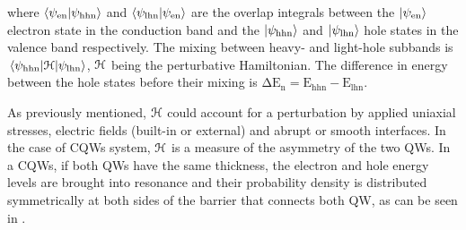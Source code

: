 where $\braket{\psi_{\mathrm{en}}}{\psi_{\mathrm{hhn}}}$  and $\braket{\psi_{\mathrm{lhn}}}{\psi_{\mathrm{en}}}$ are the overlap integrals between the  $\ket{\psi_{\mathrm{en}}}$  electron state in the conduction band and the $\ket{\psi_{\mathrm{hhn}}}$  and  $\ket{\psi_{\mathrm{lhn}}}$   hole states in the valence band respectively. The  mixing between heavy- and light-hole subbands is $\mel{\psi_{\mathrm{hhn}}}{\cal{H}}{\psi_{\mathrm{lhn}}}$, $\cal{H}$  being the  perturbative Hamiltonian. The difference in energy between the hole states before their mixing is $\mathrm{\Delta E_{n} = E_{hhn} - E_{lhn}}$.

As previously mentioned,  $\cal{H}$ could account  for a perturbation  by applied uniaxial stresses, electric fields (built-in or external) and  abrupt or smooth interfaces.
In the case of \gls{CQWs} system, $\cal{H}$ is a  measure of the  asymmetry of the two \gls{QW}s. 
In a \gls{CQWs}, if both QWs have the same thickness, the electron and hole energy levels are brought
into resonance and their probability density is distributed symmetrically at both sides of the barrier that connects both \gls{QW}, as can be seen in . 

